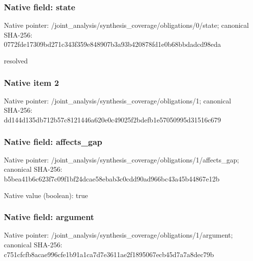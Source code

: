 \documentclass[10pt,a4paper]{article}
\begin{document}
\subsubsection{Native field: state}
Native pointer: /joint\_\allowbreak{}analysis/synthesis\_\allowbreak{}coverage/obligations/0/state; canonical SHA-256: 0772fde17309bd271c343f359e848907b3a93b420878fd1e0b68bbdadcd98eda

\begingroup\raggedright\sloppy resolved\par\endgroup

\subsubsection{Native item 2}
Native pointer: /joint\_\allowbreak{}analysis/synthesis\_\allowbreak{}coverage/obligations/1; canonical SHA-256: dd144d135db712b57c8121446a620e0c49025f2bdefb1e57050995d31516c679

\subsubsection{Native field: affects\_\allowbreak{}gap}
Native pointer: /joint\_\allowbreak{}analysis/synthesis\_\allowbreak{}coverage/obligations/1/affects\_\allowbreak{}gap; canonical SHA-256: b5bea41b6c623f7c09f1bf24dcae58ebab3c0cdd90ad966bc43a45b44867e12b

Native value (boolean): true

\subsubsection{Native field: argument}
Native pointer: /joint\_\allowbreak{}analysis/synthesis\_\allowbreak{}coverage/obligations/1/argument; canonical SHA-256: c751cfcfb8acae996cfe1b91a1ca7d7e3611ae2f1895067ecb45d7a7a8dec79b
\end{document}
